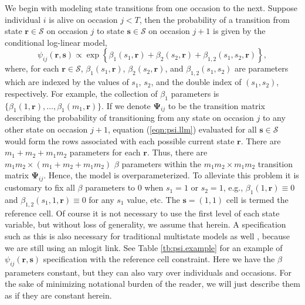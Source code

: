 \documentclass[fleqn]{article}
\newcommand{\bs}{\ensuremath{\mathbf{s}}}
\newcommand{\fS}{\ensuremath{\mathcal{S}}}
\newcommand{\br}{\ensuremath{\mathbf{r}}}
\begin{document}
We begin with modeling state transitions from one occasion to the next. Suppose individual $i$ is alive on occasion $j<T$, then the probability of a transition from state $\br\in\fS$ on occasion $j$ to state $\bs\in\fS$ on occasion $j+1$ is given by the conditional log-linear model, 
\begin{equation}
\label{eqn:psi.llm}
\psi_{ij}(\br,\bs) \propto \exp\left\{\beta_1(s_1,\br) + \beta_2(s_2,\br) + \beta_{1,2}(s_1,s_2,\br)\right\},
\end{equation}
where, for each $\br\in\fS$, $\beta_1(s_1,\br)$, $\beta_2(s_2,\br)$, and $\beta_{1,2}(s_1,s_2)$ are parameters which are indexed by the values of $s_1$, $s_2$, and the double index of $(s_1,s_2)$, respectively. For example, the collection of $\beta_1$ parameters is $\{\beta_1(1,\br),\dots,\beta_1(m_1,\br)\}$. If we denote $\boldsymbol{\Psi}_{ij}$ to be the transition matrix describing the probability of transitioning from any state on occasion $j$ to any other state on occasion $j+1$, equation (\ref{eqn:psi.llm}) evaluated for all $\bs\in \fS$ would form the rows associated with each possible current state $\br$. There are $m_1+m_2+m_1m_2$ parameters for each $\br$. Thus, there are $m_1m_2 \times (m_1+m_2+m_1m_2)$ $\beta$ parameters within the $m_1m_2\times m_1m_2$ transition matrix $\boldsymbol{\Psi}_{ij}$. Hence, the model is overparameterized. To alleviate this problem it is customary to fix all $\beta$ parameters to $0$ when $s_1=1$ or $s_2=1$, e.g., $\beta_1(1,\br)\equiv 0$ and $\beta_{1,2}(s_1,1,\br)\equiv 0$ for any $s_1$ value, etc. The $\bs=(1,1)$ cell is termed the reference cell. Of course it is not necessary to use the first level of each state variable, but without loss of generality, we assume that herein. A specification such as this is also necessary for traditional multistate models as well \citep{Laake:2013ab}, because we are still using an mlogit link. See Table \ref{tb:psi.example} for an example of $\psi_{ij}(\br,\bs)$ specification with the reference cell constraint. Here we have  the $\beta$ parameters constant, but they can also vary over individuals and occasions. For the sake of minimizing notational burden of the reader, we will just describe them as if they are constant herein. 
\end{document}
